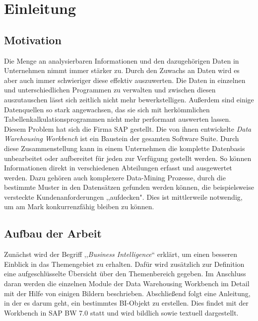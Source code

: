 \chapter{Einleitung}
\label{Kapitel:Einleitung}


\section{Motivation}
 
Die Menge an analysierbaren  Informationen und den dazugehörigen Daten in Unternehmen nimmt immer stärker zu.  Durch den Zuwachs an Daten wird es aber auch immer schwieriger diese effektiv auszuwerten. Die  Daten in einzelnen und unterschiedlichen Programmen zu verwalten und zwischen diesen auszutauschen lässt sich zeitlich nicht mehr bewerkstelligen. Außerdem sind einige Datenquellen so stark angewachsen, das sie sich mit herkömmlichen Tabellenkalkulationsprogrammen nicht mehr performant auswerten lassen. \\
Diesem Problem hat sich die Firma SAP gestellt. Die von ihnen entwickelte \textit{Data Warehousing Workbench} ist ein Baustein der gesamten Software Suite.  Durch diese Zusammenstellung kann in einem  Unternehmen die komplette Datenbasis unbearbeitet oder aufbereitet für jeden zur Verfügung gestellt werden. So können Informationen direkt in verschiedenen Abteilungen erfasst und ausgewertet werden. Dazu gehören auch komplexere Data-Mining Prozesse, durch die bestimmte Muster in den Datensätzen gefunden werden können, die beispielsweise versteckte Kundenanforderungen ,,aufdecken".  Dies ist mittlerweile notwendig, um am Mark konkurrenzfähig bleiben zu können. \cite[S. 46 f.]{Herschel:2013kz}
 
\section{ Aufbau der Arbeit}

Zunächst wird der Begriff ,,\textit{Business Intelligence}`` erklärt, um einen besseren Einblick in das Themengebiet zu erhalten. Dafür wird zusätzlich zur Definition  eine aufgeschlüsselte Übersicht über den Themenbereich gegeben. Im Anschluss daran werden die einzelnen Module der Data Warehousing Workbench im Detail mit der Hilfe von einigen Bildern beschrieben. Abschließend folgt eine Anleitung, in der es darum geht, ein bestimmtes BI-Objekt zu erstellen. Dies findet mit der Workbench in SAP BW 7.0 statt und wird bildlich sowie textuell dargestellt.